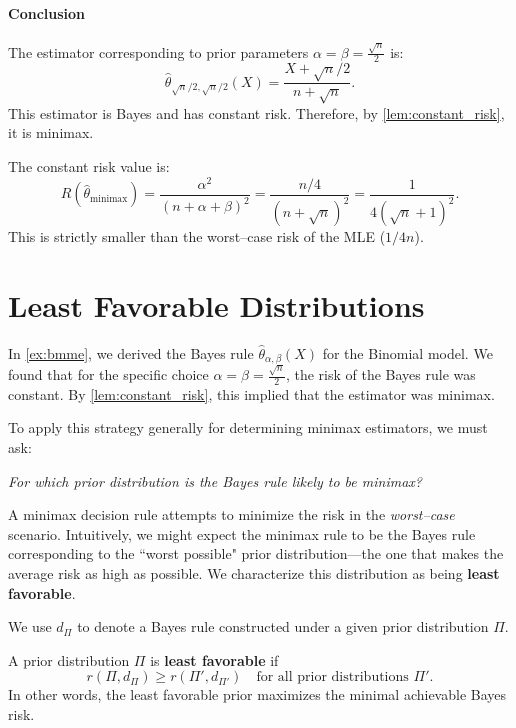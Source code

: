 \begin{ex}
    \paragraph{Conclusion}
    The estimator corresponding to prior parameters \(\alpha = \beta = \frac{\sqrt{n}}{2}\) is:
    \[ \hat{\theta}_{\sqrt{n}/2,\sqrt{n}/2}(X) = \frac{X + \sqrt{n}/2}{n + \sqrt{n}}. \]
    This estimator is Bayes and has constant risk. Therefore, by \autoref{lem:constant_risk}, it is minimax.
    
    The constant risk value is:
    \[ R(\hat{\theta}_{\text{minimax}}) = \frac{\alpha^2}{(n+\alpha+\beta)^2} = \frac{n/4}{(n+\sqrt{n})^2} = \frac{1}{4(\sqrt{n}+1)^2}. \]
    This is strictly smaller than the worst--case risk of the MLE (\(1/4n\)).
\end{ex}

\section{Least Favorable Distributions}
\label{subsec:least_favorable}

In \autoref{ex:bmme}, we derived the Bayes rule \(\hat{\theta}_{\alpha,\beta}(X)\) for the Binomial model. We found that for the specific choice \(\alpha = \beta = \frac{\sqrt{n}}{2}\), the risk of the Bayes rule was constant. By \autoref{lem:constant_risk}, this implied that the estimator was minimax.

To apply this strategy generally for determining minimax estimators, we must ask: 

\hspace{1cm}\emph{For which prior distribution is the Bayes rule likely to be minimax?}

A minimax decision rule attempts to minimize the risk in the \emph{worst--case} scenario. Intuitively, we might expect the minimax rule to be the Bayes rule corresponding to the ``worst possible" prior distribution—the one that makes the average risk as high as possible. We characterize this distribution as being \textbf{least favorable}.

\begin{notation}[]
We use \(d_{\Pi}\) to denote a Bayes rule constructed under a given prior distribution \(\Pi\).
\end{notation}

\begin{definition}
\label{def:least_favorable}
A prior distribution \(\Pi\) is \textbf{least favorable} if
\[
r(\Pi, d_{\Pi}) \ge r(\Pi', d_{\Pi'}) \quad \text{for all prior distributions } \Pi'.
\]
In other words, the least favorable prior maximizes the minimal achievable Bayes risk.
\end{definition}



